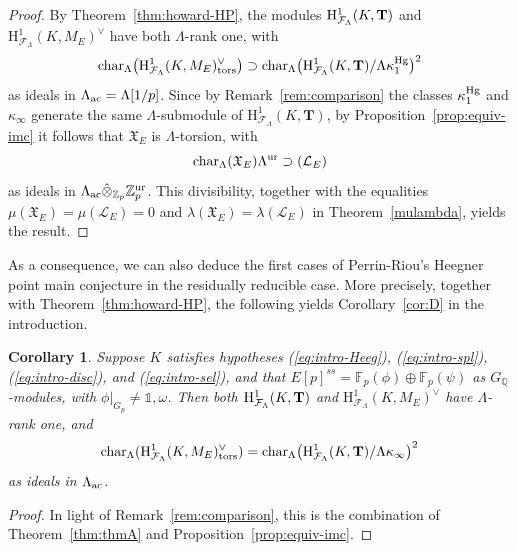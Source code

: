 \documentclass[10pt]{amsart}
\numberwithin{equation}{section}
\newtheorem{cor}[theorem]{Corollary}
\theoremstyle{definition}
\theoremstyle{remark}
\newcommand{\Fcal}{\mathcal{F}}
\newcommand{\bZ}{\mathbb{Z}}
\newcommand{\bQ}{\mathbb{Q}}
\newcommand{\rH}{\mathrm{H}}
\begin{document}
\begin{proof}
By Theorem~\ref{thm:howard-HP}, 
the modules ${\rm H}^1_{\Fcal_\Lambda}(K,\mathbf{T})$ and 
$\rH^1_{\Fcal_\Lambda}(K,M_E)^\vee$ have both $\Lambda$-rank one, with
\[
{\rm char}_\Lambda\bigl(\rH^1_{\Fcal_\Lambda}(K,M_E)^\vee_{\rm tors}\bigr)\supset{\rm char}_\Lambda\bigl({\rm H}^1_{\Fcal_\Lambda}(K,\mathbf{T})/\Lambda\kappa_1^{\rm Hg}\bigr)^2
\]
as ideals in $\Lambda_{\rm ac}=\Lambda[1/p]$. Since by Remark~\ref{rem:comparison} 
the classes $\kappa_1^{\rm Hg}$ and $\kappa_\infty$ generate the same $\Lambda$-submodule of $\rH^1_{\Fcal_\Lambda}(K,\mathbf{T})$, by Proposition~\ref{prop:equiv-imc} it follows that $\mathfrak{X}_E$ is $\Lambda$-torsion, with
\[
{\rm char}_\Lambda(\mathfrak{X}_E)\Lambda^{\rm ur}\supset(\mathcal{L}_E)
\]
as ideals in $\Lambda_{\rm ac}\hat{\otimes}_{\bZ_p}\bZ_p^{\rm ur}$. This divisibility, together with the equalities $\mu(\mathfrak{X}_E)=\mu(\mathcal{L}_E)=0$ and $\lambda(\mathfrak{X}_E)=\lambda(\mathcal{L}_E)$ in Theorem~\ref{mulambda}, yields the result.
\end{proof}

As a consequence, we can also deduce the first cases of Perrin-Riou's Heegner point main conjecture \cite{perrinriou} in the residually reducible case. More precisely, together with Theorem~\ref{thm:howard-HP}, the following yields Corollary~\ref{cor:D} in the introduction. 

\begin{cor}\label{cor:PR} Suppose $K$ satisfies hypotheses {\rm (\ref{eq:intro-Heeg})}, {\rm (\ref{eq:intro-spl})},  {\rm (\ref{eq:intro-disc})}, and {\rm (\ref{eq:intro-sel})}, and that
$E[p]^{ss}=\mathbb{F}_p(\phi)\oplus\mathbb{F}_p(\psi)$ as $G_\bQ$-modules, with $\phi\vert_{G_p}\neq\mathds{1},\omega$. 
Then both ${\rm H}^1_{\Fcal_\Lambda}(K,\mathbf{T})$ and 
$\rH^1_{\Fcal_\Lambda}(K,M_E)^\vee$ have $\Lambda$-rank one, and
\[
\mathrm{char}_\Lambda(\rH^1_{\Fcal_\Lambda}(K,M_E)^\vee_{\rm tors})=\mathrm{char}_\Lambda\bigl({\rm H}^1_{\Fcal_\Lambda}(K,\mathbf{T})/\Lambda\kappa_\infty\bigr)^2
\]
as ideals in $\Lambda_{\rm ac}$.
\end{cor}

\begin{proof}
In light of Remark~\ref{rem:comparison}, this is the combination of Theorem~\ref{thm:thmA} and Proposition~\ref{prop:equiv-imc}.
\end{proof}
\end{document}
